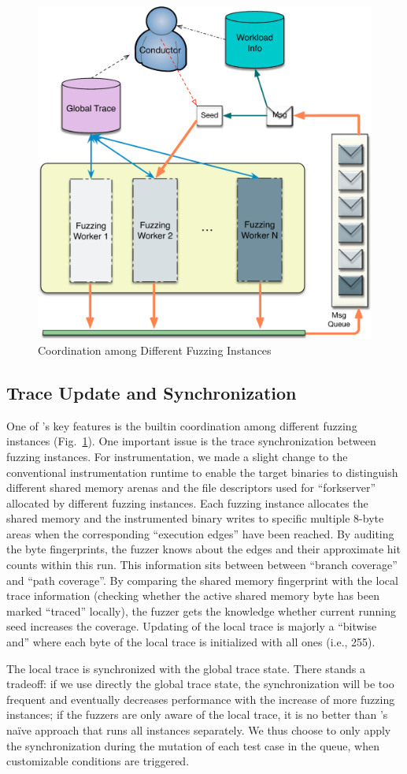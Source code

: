 \begin{figure}[t]
	\centering
	\includegraphics[width=0.6\columnwidth]{res/fot/mt_workflow}
	\caption{Coordination among Different Fuzzing Instances}
	\label{fig:mt_workflow}
\end{figure}


\subsection{Trace Update and Synchronization}\label{sec:trace_sync}
One of {\FOT}'s key features is the builtin coordination among different fuzzing instances (Fig.~\ref{fig:mt_workflow}). One important issue is the trace synchronization between fuzzing instances. For instrumentation, we made a slight change to the conventional instrumentation runtime to enable the target binaries to distinguish different shared memory arenas and the file descriptors used for ``forkserver'' allocated by different fuzzing instances. Each fuzzing instance allocates the shared memory and the instrumented binary writes to specific multiple 8-byte areas when the corresponding ``execution edges'' have been reached. By auditing the byte fingerprints, the fuzzer knows about the edges and their approximate hit counts within this run. This information sits between between ``branch coverage'' and ``path coverage''. By comparing the shared memory fingerprint with the local trace information (checking whether the active shared memory byte has been marked ``traced'' locally), the fuzzer gets the knowledge whether current running seed increases the coverage. Updating of the local trace is majorly a ``bitwise and'' where each byte of the local trace is initialized with all ones (i.e., 255).

The local trace is synchronized with the global trace state. There stands a tradeoff: if we use directly the global trace state, the synchronization will be too frequent and eventually decreases performance with the increase of more fuzzing instances; if the fuzzers are only aware of the local trace, it is no better than {\AFL}'s na\"ive approach that runs all instances separately. We thus choose to only apply the synchronization during the mutation of each test case in the queue, when customizable conditions are triggered.

